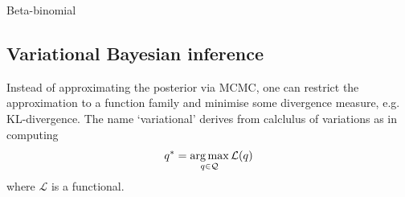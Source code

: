 \documentclass[11pt]{article}
\begin{document}
\begin{appendices}
\begin{example}
    Beta-binomial
\end{example}

\subsection{Variational Bayesian inference}
Instead of approximating the posterior via MCMC, one can restrict the approximation to a function family and minimise some divergence measure, e.g. KL-divergence. The name `variational' derives from calclulus of variations as in computing
$$
q^*
=
\operatorname*{arg\,max}_{q\in\mathcal{Q}}\mathcal{L}(q)
$$
where $\mathcal{L}$ is a functional.





\end{appendices}
\end{document}
